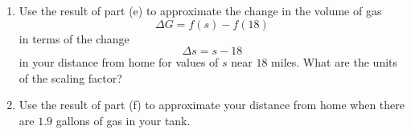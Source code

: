 \documentclass{ximera}
\begin{document}
\begin{example}
\begin{enumerate}


\item Use the result of part (e) to approximate the change in the volume of gas
\[
    \Delta G = f(s)-f(18)
\]
in terms of the change
\[
   \Delta s = s - 18
\]
in your distance from home for values of $s$ near $18$ miles. What are the units of the scaling factor?

\item Use the result of part (f) to approximate your distance from home when there are $1.9$ gallons of gas in your tank.


\end{enumerate}


\end{example}
\end{document}

